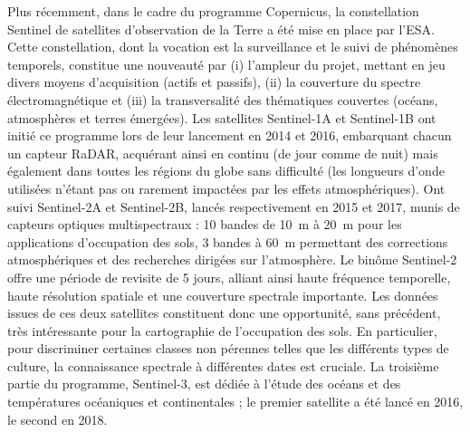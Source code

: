Plus récemment, dans le cadre du programme Copernicus, la constellation Sentinel de satellites d'observation de la Terre a été mise en place par l'ESA. Cette constellation, dont la vocation est la surveillance et le suivi de phénomènes temporels, constitue une nouveauté par (i) l'ampleur du projet, mettant en jeu divers moyens d'acquisition (actifs et passifs), (ii) la couverture du spectre électromagnétique  et (iii) la transversalité des thématiques couvertes (océans, atmosphères et terres émergées). Les satellites Sentinel-1A et Sentinel-1B\cite{TORRES20129} ont initié ce programme lors de leur lancement en 2014 et 2016, embarquant chacun un capteur RaDAR, acquérant ainsi en continu (de jour comme de nuit) mais également dans toutes les régions du globe sans difficulté (les longueurs d'onde utilisées n'étant pas ou rarement impactées par les effets atmosphériques). Ont suivi Sentinel-2A et Sentinel-2B\cite{DRUSCH201225}, lancés respectivement en 2015 et 2017, munis de capteurs optiques multispectraux : 10 bandes de \SI{10}{\meter} à \SI{20}{\meter} pour les applications d'occupation des sols, 3 bandes à \SI{60}{\meter} permettant des corrections atmosphériques et des recherches dirigées sur l'atmosphère. Le binôme Sentinel-2 offre une période de revisite de 5 jours, alliant ainsi haute fréquence temporelle, haute résolution spatiale et une couverture spectrale importante. Les données issues de ces deux satellites constituent donc une opportunité, sans précédent, très intéressante pour la cartographie de l'occupation des sols. En particulier, pour discriminer certaines classes non pérennes telles que les différents types de culture, la connaissance spectrale à différentes dates est cruciale. La troisième partie du programme, Sentinel-3\cite{DONLON201237}, est dédiée à l'étude des océans et des températures océaniques et continentales ; le premier satellite a été lancé en 2016, le second en 2018.\\

